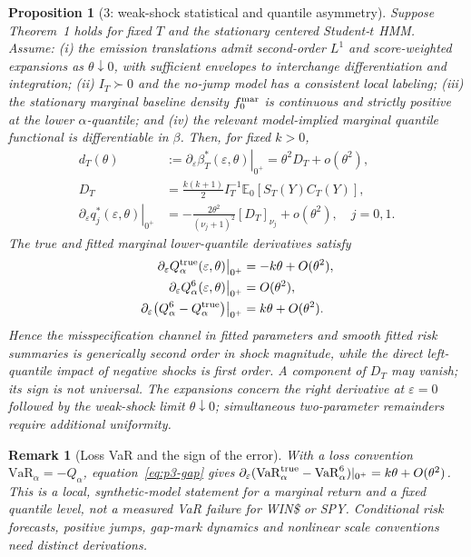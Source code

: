 \documentclass[11pt,a4paper]{article}
\newtheorem{proposition}{Proposition}
\newtheorem{remark}{Remark}
\newcommand{\E}{\mathbb E}
\newcommand{\eps}{\varepsilon}
\begin{document}
\begin{proposition}[3: weak-shock statistical and quantile asymmetry]\label{prop:p3}
Suppose Theorem~1 holds for fixed $T$ and the stationary centered Student-$t$ HMM. Assume: (i) the emission translations admit second-order $L^1$ and score-weighted expansions as $\theta\downarrow0$, with sufficient envelopes to interchange differentiation and integration; (ii) $I_T\succ0$ and the no-jump model has a consistent local labeling; (iii) the stationary marginal baseline density $f_0^{\rm mar}$ is continuous and strictly positive at the lower $\alpha$-quantile; and (iv) the relevant model-implied marginal quantile functional is differentiable in $\beta$. Then, for fixed $k>0$,
\begin{align}
 d_T(\theta)&:=\left.\partial_{\eps}\beta_T^*(\eps,\theta)\right|_{0^+}
 =\theta^2D_T+o(\theta^2),\label{eq:p3-deriv}\\
 D_T&=\frac{k(k+1)}{2}I_T^{-1}\E_0[S_T(Y)C_T(Y)],\label{eq:p3-d}\\
 \left.\partial_{\eps}q_j^*(\eps,\theta)\right|_{0^+}
 &=-\frac{2\theta^2}{(\nu_j+1)^2}[D_T]_{\nu_j}+o(\theta^2),\quad j=0,1.\label{eq:p3-q}
\end{align}
The true and fitted \emph{marginal} lower-quantile derivatives satisfy
\begin{align}
\left.\partial_{\eps}Q_{\alpha}^{\rm true}(\eps,\theta)\right|_{0^+}&=-k\theta+O(\theta^2),\label{eq:p3-qtrue}\\
\left.\partial_{\eps}Q_{\alpha}^{6}(\eps,\theta)\right|_{0^+}&=O(\theta^2),\label{eq:p3-qfit}\\
\left.\partial_{\eps}\bigl(Q_{\alpha}^{6}-Q_{\alpha}^{\rm true}\bigr)\right|_{0^+}&=k\theta+O(\theta^2).\label{eq:p3-gap}
\end{align}
Hence the misspecification channel in fitted parameters and smooth fitted risk summaries is generically second order in \emph{shock magnitude}, while the direct left-quantile impact of negative shocks is first order. A component of $D_T$ may vanish; its sign is not universal. The expansions concern the \emph{right derivative at $\eps=0$ followed by the weak-shock limit $\theta\downarrow0$}; simultaneous two-parameter remainders require additional uniformity.
\end{proposition}

\begin{remark}[Loss VaR and the sign of the error]\label{rem:p3-var}
With a loss convention $\mathrm{VaR}_{\alpha}=-Q_{\alpha}$, equation~\eqref{eq:p3-gap} gives
$\partial_{\eps}(\mathrm{VaR}_{\alpha}^{\rm true}-\mathrm{VaR}_{\alpha}^{6})|_{0^+}=k\theta+O(\theta^2)$. This is a local, synthetic-model statement for a marginal return and a fixed quantile level, not a measured VaR failure for WIN\$ or SPY. Conditional risk forecasts, positive jumps, gap-mark dynamics and nonlinear scale conventions need distinct derivations.
\end{remark}
\end{document}
